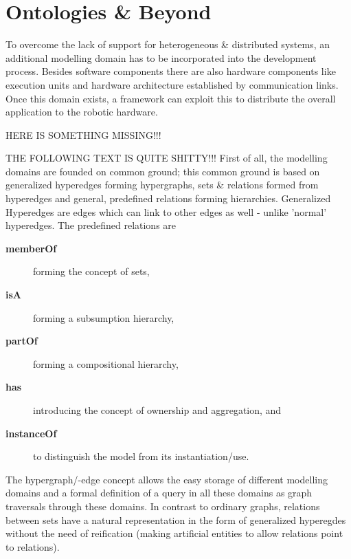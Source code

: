 \documentclass[a4paper,twocolumn]{esapub2005} %
\begin{document}


\section{Ontologies \& Beyond}
To overcome the lack of support for heterogeneous \& distributed systems, an additional modelling domain has to be incorporated into the development process.
Besides software components there are also hardware components like execution units and hardware architecture established by communication links.
Once this domain exists, a framework can exploit this to distribute the overall application to the robotic hardware.

HERE  IS SOMETHING MISSING!!!

THE FOLLOWING TEXT IS QUITE SHITTY!!!
First of all, the modelling domains are founded on common ground; this common ground is based on generalized hyperedges forming hypergraphs, sets \& relations formed from hyperedges and general, predefined relations forming hierarchies.
Generalized Hyperedges are edges which can link to other edges as well - unlike 'normal' hyperedges.
The predefined relations are
\begin{description}
    \item[\textbf{memberOf}] forming the concept of sets,
    \item[\textbf{isA}] forming a subsumption hierarchy,
    \item[\textbf{partOf}] forming a compositional hierarchy,
    \item[\textbf{has}] introducing the concept of ownership and aggregation, and
    \item[\textbf{instanceOf}] to distinguish the model from its instantiation/use.
\end{description}
The hypergraph/-edge concept allows the easy storage of different modelling domains and a formal definition of a query in all these domains as graph traversals through these domains.
In contrast to ordinary graphs, relations between sets have a natural representation in the form of generalized hyperegdes without the need of reification (making artificial entities to allow relations point to relations).
\end{document}
